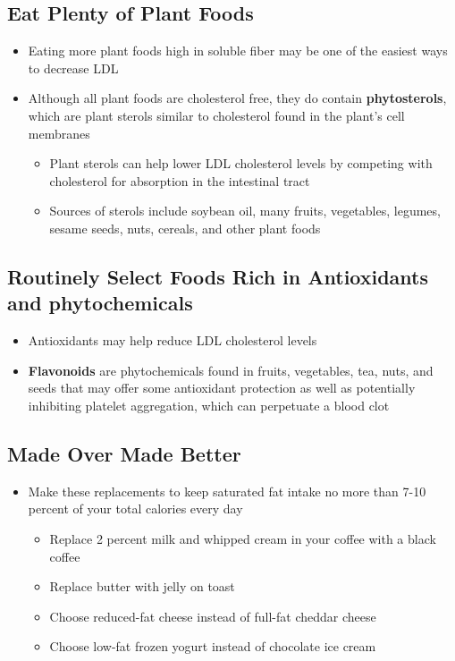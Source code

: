 \documentclass[12pt]{article}
\begin{document}
        \subsection{Eat Plenty of Plant Foods}
            \begin{itemize}
                \item Eating more plant foods high in soluble fiber may be one of the easiest ways to decrease LDL
                \item Although all plant foods are cholesterol free, they do contain \textbf{phytosterols}, which are plant sterols similar to cholesterol found in the plant's cell membranes
                    \begin{itemize}
                        \item Plant sterols can help lower LDL cholesterol levels by competing with cholesterol for absorption in the intestinal tract
                        \item Sources of sterols include soybean oil, many fruits, vegetables, legumes, sesame seeds, nuts, cereals, and other plant foods
                    \end{itemize}
            \end{itemize}

        \subsection{Routinely Select Foods Rich in Antioxidants and phytochemicals}
            \begin{itemize}
                \item Antioxidants may help reduce LDL cholesterol levels
                \item \textbf{Flavonoids} are phytochemicals found in fruits, vegetables, tea, nuts, and seeds that may offer some antioxidant protection as well as potentially inhibiting platelet aggregation, which can perpetuate a blood clot
            \end{itemize}
        
        \subsection{Made Over Made Better}
            \begin{itemize}
                \item Make these replacements to keep saturated fat intake no more than 7-10 percent of your total calories every day
                    \begin{itemize}
                        \item Replace 2 percent milk and whipped cream in your coffee with a black coffee
                        \item Replace butter with jelly on toast
                        \item Choose reduced-fat cheese instead of full-fat cheddar cheese
                        \item Choose low-fat frozen yogurt instead of chocolate ice cream
                    \end{itemize}
            \end{itemize}
\end{document}
